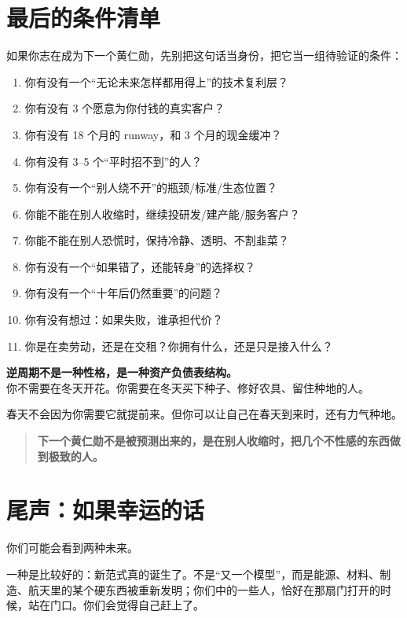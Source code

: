 \chapter{最后的条件清单}\label{ux6700ux540eux7684ux6761ux4ef6ux6e05ux5355}

如果你志在成为下一个黄仁勋，先别把这句话当身份，把它当一组待验证的条件：

\begin{enumerate}
\def\labelenumi{\arabic{enumi}.}
\tightlist
\item
  你有没有一个``无论未来怎样都用得上''的技术复利层？
\item
  你有没有 3 个愿意为你付钱的真实客户？
\item
  你有没有 18 个月的 runway，和 3 个月的现金缓冲？
\item
  你有没有 3--5 个``平时招不到''的人？
\item
  你有没有一个``别人绕不开''的瓶颈/标准/生态位置？
\item
  你能不能在别人收缩时，继续投研发/建产能/服务客户？
\item
  你能不能在别人恐慌时，保持冷静、透明、不割韭菜？
\item
  你有没有一个``如果错了，还能转身''的选择权？
\item
  你有没有一个``十年后仍然重要''的问题？
\item
  你有没有想过：如果失败，谁承担代价？
\item
  你是在卖劳动，还是在交租？你拥有什么，还是只是接入什么？
\end{enumerate}

\textbf{逆周期不是一种性格，是一种资产负债表结构。}\\
你不需要在冬天开花。你需要在冬天买下种子、修好农具、留住种地的人。

春天不会因为你需要它就提前来。但你可以让自己在春天到来时，还有力气种地。

\begin{quote}
\textbf{下一个黄仁勋不是被预测出来的，是在别人收缩时，把几个不性感的东西做到极致的人。}
\end{quote}

\chapter*{尾声：如果幸运的话}

你们可能会看到两种未来。

一种是比较好的：新范式真的诞生了。不是``又一个模型''，而是能源、材料、制造、航天里的某个硬东西被重新发明；你们中的一些人，恰好在那扇门打开的时候，站在门口。你们会觉得自己赶上了。

